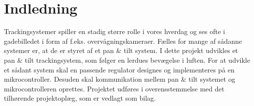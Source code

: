 \section*{Indledning}
Trackingsystemer spiller en stadig større rolle i vores hverdag og ses ofte i gadebilledet i form 
af f.eks. overvågningskameraer.
Fælles for mange af sådanne systemer er, at de er styret af et pan \& tilt system. 
I dette projekt udvikles et pan \& tilt trackingsystem, som følger en lerdues bevægelse i 
luften. For at udvikle et sådant system skal en passende regulator designes og implementeres
på en mikrocontroller. 
Desuden skal kommunikation mellem pan \& tilt systemet og mikrocontrolleren oprettes.
Projektet udføres i overensstemmelse med det tilhørende projektoplæg, som er vedlagt 
som bilag.
